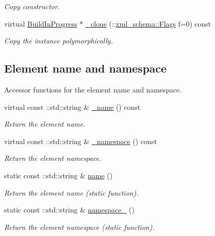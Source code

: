 \begin{DoxyCompactItemize}
\begin{DoxyCompactList}\small\item\em Copy constructor. \item\end{DoxyCompactList}\item 
virtual \hyperlink{classopenstack_1_1xml_1_1BuildInProgress}{BuildInProgress} $\ast$ \hyperlink{classopenstack_1_1xml_1_1BuildInProgress_a8e67d1b205c1ff404c43766e198b1776}{\_\-clone} (::\hyperlink{namespacexml__schema_affb4c227cbd9aa7453dd1dc5a1401943}{xml\_\-schema::Flags} f=0) const 
\begin{DoxyCompactList}\small\item\em Copy the instance polymorphically. \item\end{DoxyCompactList}\end{DoxyCompactItemize}
\subsection*{Element name and namespace}
\label{_amgrpd4b5b61f6e07390f4af2465e04571f34}
Accessor functions for the element name and namespace. \begin{DoxyCompactItemize}
\item 
virtual const ::std::string \& \hyperlink{classopenstack_1_1xml_1_1BuildInProgress_a4c2346e1398b7223e45f892cc71ad1c7}{\_\-name} () const 
\begin{DoxyCompactList}\small\item\em Return the element name. \item\end{DoxyCompactList}\item 
virtual const ::std::string \& \hyperlink{classopenstack_1_1xml_1_1BuildInProgress_a550c76d7774d3cf6964d2dd53838c33e}{\_\-namespace} () const 
\begin{DoxyCompactList}\small\item\em Return the element namespace. \item\end{DoxyCompactList}\item 
static const ::std::string \& \hyperlink{classopenstack_1_1xml_1_1BuildInProgress_ae6a8fe01eb7dffe20315fcfe479a1be7}{name} ()
\begin{DoxyCompactList}\small\item\em Return the element name (static function). \item\end{DoxyCompactList}\item 
static const ::std::string \& \hyperlink{classopenstack_1_1xml_1_1BuildInProgress_a5aa8658bd08d82231f5aa31cb012be39}{namespace\_\-} ()
\begin{DoxyCompactList}\small\item\em Return the element namespace (static function). \item\end{DoxyCompactList}\end{DoxyCompactItemize}



